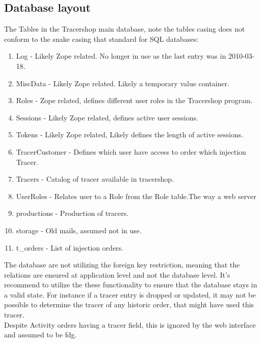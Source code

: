 \documentclass{article}
\begin{document}
\subsection*{Database layout}
The Tables in the Tracershop main database, note the tables casing does not conform to the snake casing that standard for SQL databases:
\begin{enumerate}
  \item Log - Likely Zope related. No longer in use as the last entry was in 2010-03-18.
  \item MiscData - Likely Zope related. Likely a temporary value container.
  \item Roles - Zope related, defines different user roles in the Tracershop program.
  \item Sessions - Likely Zope related, defines active user sessions.
  \item Tokens - Likely Zope related, Likely defines the length of active sessions.
  \item TracerCustomer - Defines which user have access to order which injection Tracer.
  \item Tracers - Catalog of tracer available in tracershop.
  \item UserRoles - Relates user to a Role from the Role table.The way a web server 
  \item productions - Production of tracers.
  \item storage - Old mails, assumed not in use.
  \item t\_orders - List of injection orders.
\end{enumerate}
The database are not utilizing the foreign key restriction, meaning that the relations are ensured at application level and not the database level.
It's recommend to utilize the these functionality to ensure that the database stays in a valid state.
For instance if a tracer entry is dropped or updated, it may not be possible to determine the tracer of any historic order, that might have used this tracer.\\
Despite Activity orders having a tracer field, this is ignored by the web interface and assumed to be \Gls{fdg}.
\end{document}
